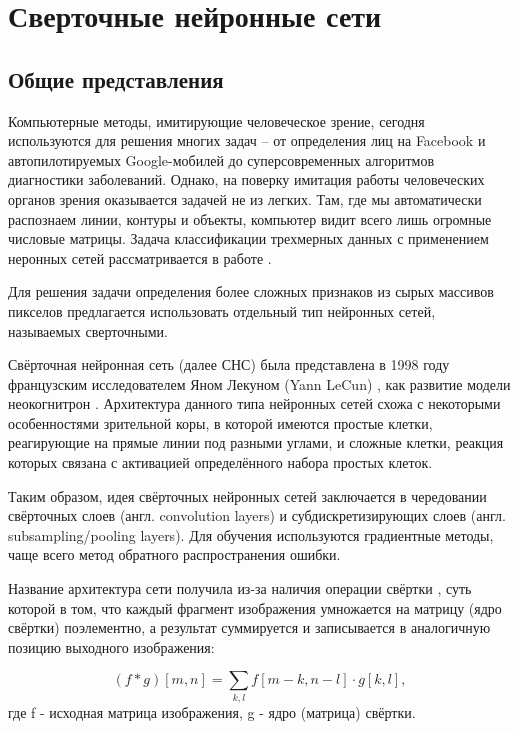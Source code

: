 \documentclass[14pt]{article}
\numberwithin{figure}{section}
\numberwithin{equation}{section}
\begin{document}
\newpage

\section{Сверточные нейронные сети}

\subsection{Общие представления}

Компьютерные методы, имитирующие человеческое зрение, сегодня используются для решения многих задач – от определения лиц на Facebook и автопилотируемых Google-мобилей до суперсовременных алгоритмов диагностики заболеваний. Однако, на поверку имитация работы человеческих органов зрения оказывается задачей не из легких. Там, где мы автоматически распознаем линии, контуры и объекты, компьютер видит всего лишь огромные числовые матрицы. Задача классификации трехмерных данных с применением неронных сетей рассматривается в работе \cite{Fors}.

Для решения задачи определения более сложных признаков из сырых массивов пикселов предлагается использовать отдельный тип нейронных сетей, называемых сверточными.

Свёрточная нейронная сеть (далее СНС) была представлена в 1998 году французским исследователем Яном Лекуном (Yann LeCun) \cite{LeCun}, как развитие модели неокогнитрон \cite{Fukushima}. Архитектура данного типа нейронных сетей схожа с некоторыми особенностями зрительной коры, в которой имеются простые клетки, реагирующие на прямые линии под разными углами, и сложные клетки, реакция которых связана с активацией определённого набора простых клеток.

Таким образом, идея свёрточных нейронных сетей заключается в чередовании свёрточных слоев (англ. convolution layers) и субдискретизирующих слоев (англ. subsampling/pooling layers). Для обучения используются градиентные методы, чаще всего метод обратного распространения ошибки.

Название архитектура сети получила из-за наличия операции свёртки \cite{Borisov1}, суть которой в том, что каждый фрагмент изображения умножается на матрицу (ядро свёртки) поэлементно, а результат суммируется и записывается в аналогичную позицию выходного изображения:

\begin{equation}\label{eq3}
	(f * g)[m, n] = \sum_{k,l}{f[m - k, n - l] \cdot g[k, l]},
\end{equation}
где f - исходная матрица изображения, g - ядро (матрица) свёртки.
\end{document}
